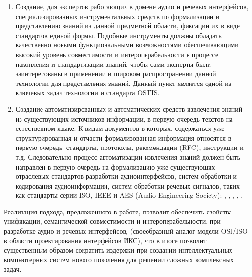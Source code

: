 \begin{enumerate}
  \item Создание, для экспертов работающих в домене аудио и речевых интерфейсов, специализированных инструментальных средств по формализации и представлению знаний из данной предметной области, фиксации их в виде стандартов единой формы. Подобные инструменты должны обладать качественно новыми функциональными возможностями обеспечивающими высокий уровень совместимости и интероперабельности в процессе накопления и стандартизации знаний, чтобы сами эксперты были заинтересованы в применении и широком распространении данной технологии для представления знаний. Данный пункт является одной из ключевых задач технологии и стандарта OSTIS.
  \item Создание автоматизированных и автоматических средств извлечения знаний из существующих источников информации, в первую очередь текстов на естественном языке. К видам документов в которых, содержаться уже структурированная и отчасти формализованная информация относятся в первую очередь: стандарты, протоколы,  рекомендации (RFC), инструкции и т.д. Следовательно процесс автоматизации извлечения знаний должен быть направлен в первую очередь на формализацию уже существующих отраслевых стандартов разработки аудиоинтерфейсов, систем обработки и кодирования аудиоинформации, систем обработки речевых сигналов, таких как стандарты серии ISO, IEEE и AES (Audio Engineering Society): , , , , .
\end{enumerate}

Реализация подхода, предложенного в работе, позволит обеспечить свойства унификации, семантической совместимости и интероперабельности, при разработке аудио и речевых интерфейсов, (своеобразный аналог модели OSI/ISO в области проектирования интерфейсов ИКС), что в итоге позволит существенным образом сократить издержки при создании интеллектуальных компьютерных систем нового поколения для решении сложных комплексных задач.


%